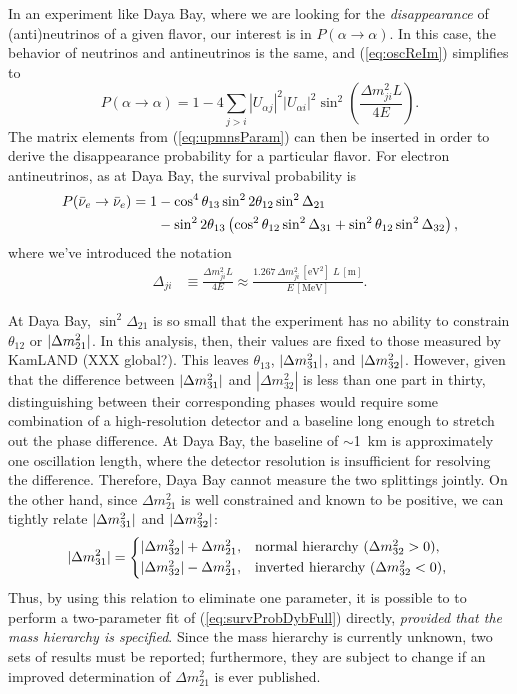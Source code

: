 \documentclass[../thesis.tex]{subfiles}
\begin{document}
In an experiment like Daya Bay, where we are looking for the
\emph{disappearance} of (anti)neutrinos of a given flavor, our interest is in
$P(\alpha \rightarrow \alpha)$. In this case, the behavior of neutrinos and
antineutrinos is the same, and (\ref{eq:oscReIm}) simplifies to
\[P(\alpha \rightarrow \alpha) = 1 - 4 \sum_{j>i} |U_{\alpha j}|^2 |U_{\alpha
    i}|^2 \sin^2\left( \frac{\Delta m^2_{ji} L}{4E} \right). \] The matrix
elements from (\ref{eq:upmnsParam}) can then be inserted in order to derive the
disappearance probability for a particular flavor. For electron antineutrinos,
as at Daya Bay, the survival probability is
\begin{align}
  \label{eq:survProbDybFull}
  \begin{split}
    P(\bar\nu_e \rightarrow \bar\nu_e) =
    1 &- \cos^4\theta_{13}\sin^2 2\theta_{12} \sin^2 \Delta_{21} \\
    &- \sin^2 2\theta_{13}\left( \cos^2\theta_{12} \sin^2 \Delta_{31} +
      \sin^2\theta_{12} \sin^2 \Delta_{32}\right),
  \end{split}
\end{align}
where we've introduced the notation
\begin{align*}
  \Delta_{ji} &\equiv \frac{\Delta m^2_{ji}L}{4E}
                \approx \frac{1.267\, \Delta m^2_{ji}\,\mathrm{[eV^2]}\;
                L\,\mathrm{[m]}}{E\,\mathrm{[MeV]}}.
\end{align*}

At Daya Bay, $\sin^2 \Delta_{21}$ is so small that the experiment has no ability
to constrain $\theta_{12}$ or $\lvert \Delta m^2_{21}\rvert$. In this analysis, then,
their values are fixed to those measured by KamLAND (XXX global?). This leaves
$\theta_{13}$, $\lvert \Delta m^2_{31}\rvert$, and $\lvert \Delta m^2_{32}\rvert$. However,
given that the difference between $\lvert \Delta m^2_{31}\rvert$ and $|\Delta
m^2_{32}|$ is less than one part in thirty, distinguishing between their
corresponding phases would require some combination of a high-resolution
detector and a baseline long enough to stretch out the phase difference. At Daya
Bay, the baseline of $\sim$1~km is approximately one oscillation length, where
the detector resolution is insufficient for resolving the difference. Therefore,
Daya Bay cannot measure the two splittings jointly. On the other hand, since
$\Delta m^2_{21}$ is well constrained and known to be positive, we can tightly
relate $\lvert \Delta m^2_{31}\rvert$ and $\lvert \Delta m^2_{32}\rvert$:
\[ \abs{\Delta m^2_{31}} =
  \begin{cases*}
    \abs{\Delta m^2_{32}} + \Delta m^2_{21}, & normal hierarchy ($\Delta m^2_{32} > 0$), \\
    \abs{\Delta m^2_{32}} - \Delta m^2_{21}, & inverted hierarchy ($\Delta m^2_{32} < 0$), \\
  \end{cases*}
\]
Thus, by using this relation to eliminate one parameter, it is possible to to
perform a two-parameter fit of (\ref{eq:survProbDybFull}) directly,
\emph{provided that the mass hierarchy is specified}. Since the mass hierarchy
is currently unknown, two sets of results must be reported; furthermore, they
are subject to change if an improved determination of $\Delta m^2_{21}$ is ever
published.
\end{document}
